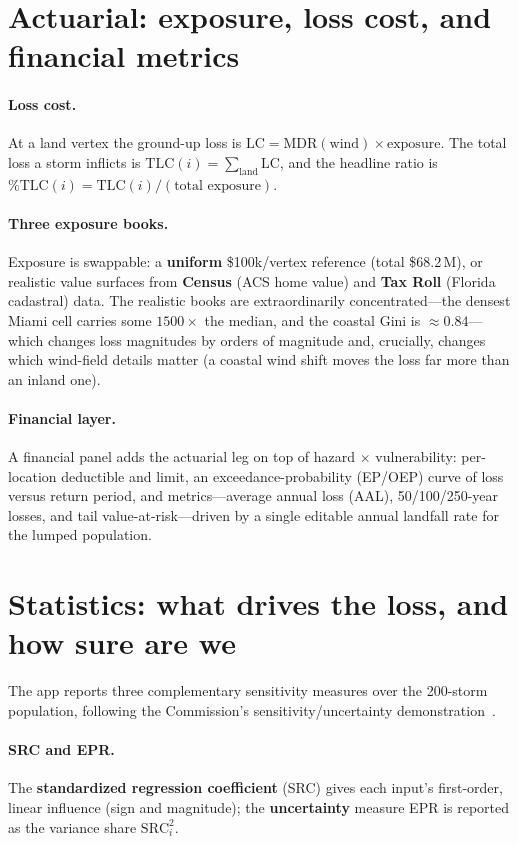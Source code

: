 \documentclass[11pt]{article}
\begin{document}
\section{Actuarial: exposure, loss cost, and financial metrics}

\paragraph{Loss cost.} At a land vertex the ground-up loss is
$\mathrm{LC}=\mathrm{MDR(wind)}\times\mathrm{exposure}$. The total loss a storm inflicts
is $\mathrm{TLC}(i)=\sum_{\text{land}}\mathrm{LC}$, and the headline ratio is
$\%\mathrm{TLC}(i)=\mathrm{TLC}(i)/(\text{total exposure})$.

\paragraph{Three exposure books.} Exposure is swappable: a \textbf{uniform}
\$100k/vertex reference (total \$68.2\,M), or realistic value surfaces from
\textbf{Census} (ACS home value) and \textbf{Tax Roll} (Florida cadastral) data. The
realistic books are extraordinarily concentrated---the densest Miami cell carries some
$1500\times$ the median, and the coastal Gini is $\approx0.84$---which changes loss
magnitudes by orders of magnitude and, crucially, changes which wind-field details
matter (a coastal wind shift moves the loss far more than an inland one).

\paragraph{Financial layer.} A financial panel adds the actuarial leg on top of
hazard $\times$ vulnerability: per-location deductible and limit, an exceedance-probability
(EP/OEP) curve of loss versus return period, and metrics---average annual loss (AAL),
50/100/250-year losses, and tail value-at-risk---driven by a single editable annual
landfall rate for the lumped population.

\section{Statistics: what drives the loss, and how sure are we}
\label{sec:stats}
The app reports three complementary sensitivity measures over the 200-storm population,
following the Commission's sensitivity/uncertainty demonstration~\cite{iman}.

\paragraph{SRC and EPR.} The \textbf{standardized regression coefficient} (SRC) gives
each input's first-order, linear influence (sign and magnitude); the \textbf{uncertainty}
measure EPR is reported as the variance share $\mathrm{SRC}_i^2$.
\end{document}

